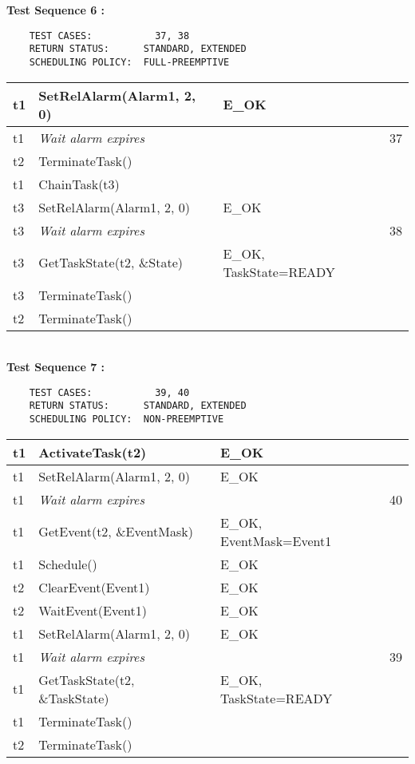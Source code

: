 \documentclass[10pt]{article}
\newlength{\Li}\settowidth{\Li}{Running}
\newlength{\Lii}\setlength{\Lii}{7cm}
\newlength{\Liiii}\setlength{\Liiii}{0.9cm}
\newlength{\Liii}\setlength{\Liii}{\textwidth} \addtolength{\Liii}{-\Li} \addtolength{\Liii}{-\Lii} \addtolength{\Liii}{-\Liiii}
\begin{document}
	\textbf{Test Sequence 6 :}
	\begin{lstlisting}
	TEST CASES:		      37, 38
	RETURN STATUS:	    STANDARD, EXTENDED
	SCHEDULING POLICY:  FULL-PREEMPTIVE
	\end{lstlisting}
	
	
	\begin{supertabular}{|p{\Li}|p{\Lii}|p{\Liii}|p{\Liiii}|} \hline 
	t1	& SetRelAlarm(Alarm1, 2, 0)				& E\_OK 					& \\ \hline 
	t1	& \textit{Wait alarm expires}			 	& 						& 37 \\ \hline 
	t2 	& TerminateTask()						&						& \\ \hline 
	t1	& ChainTask(t3) 						&						&\\ \hline 
	t3	& SetRelAlarm(Alarm1, 2, 0)				& E\_OK					& \\ \hline 
	t3	& \textit{Wait alarm expires}			 	& 						& 38 \\ \hline 
	t3 	& GetTaskState(t2, \&State) 				& E\_OK, TaskState=READY	& \\ \hline 
	t3	& TerminateTask()						&						&\\ \hline 
	t2 	& TerminateTask() 						& 						& \\ \hline 
	\end{supertabular} \\
	
	\textbf{Test Sequence 7 :}
	\begin{lstlisting}
	TEST CASES:		      39, 40
	RETURN STATUS:	    STANDARD, EXTENDED
	SCHEDULING POLICY:  NON-PREEMPTIVE
	\end{lstlisting}
	
	
	\begin{supertabular}{|p{\Li}|p{\Lii}|p{\Liii}|p{\Liiii}|} \hline 
	t1 	& ActivateTask(t2)						& E\_OK					& \\ \hline 
	t1	& SetRelAlarm(Alarm1, 2, 0)				& E\_OK					& \\ \hline 
	t1	& \textit{Wait alarm expires}			 	& 						& 40 \\ \hline  
	t1	& GetEvent(t2, \&EventMask) 				& E\_OK, EventMask=Event1	&\\ \hline 
	t1	& Schedule() 							& E\_OK					& \\ \hline 
	t2	& ClearEvent(Event1) 					& E\_OK					& \\ \hline 
	t2	& WaitEvent(Event1) 					& E\_OK					& \\ \hline 
	t1	& SetRelAlarm(Alarm1, 2, 0)				& E\_OK					& \\ \hline 
	t1	& \textit{Wait alarm expires}			 	& 						& 39 \\ \hline 
	t1	& GetTaskState(t2, \&TaskState) 			& E\_OK, TaskState=READY	&\\ \hline  
	t1	& TerminateTask()						&						&\\ \hline 
	t2 	& TerminateTask() 						& 						& \\ \hline 
	\end{supertabular} \\
	
\end{document}
